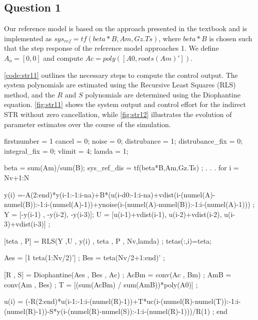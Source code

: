 \FloatBarrier
\subsection{Question 1}
Our reference model is based on the approach presented in the textbook and is implemented as $sys_{ref}=tf(beta*B,Am,Gz.Ts)$, where $beta*B$ is chosen such that the step response of the reference model approaches 1. We define $A_o =  [0 ,0]$ and compute $ Ac = poly([A0 ,roots(Am)'])$.

\autoref{code:str11} outlines the necessary steps to compute the control output. The system polynomials are estimated using the Recursive Least Squares (RLS) method, and the $R$ and $S$ polynomials are determined using the Diophantine equation. \autoref{fig:str11} shows the system output and control effort for the indirect STR without zero cancellation, while \autoref{fig:str12} illustrates the evolution of parameter estimates over the course of the simulation.


\begin{code}
	\begin{matlabcode}{firstnumber = 1}
cancel = 0; %
noise = 0; %
distrubance = 1; %
distrubance_fix = 0; %
integral_fix = 0; %
vlimit = 4; %
lamda = 1;

beta = sum(Am)/sum(B);
sys_ref_dis = tf(beta*B,Am,Gz.Ts) ;
. . .
for i = Nv+1:N
	
	y(i) =-A(2:end)*y(i-1:-1:i-na)+B*(u(i-d0:-1:i-na)+vdist(i-(numel(A)-numel(B)):-1:i-(numel(A)-1))+ynoise(i-(numel(A)-numel(B)):-1:i-(numel(A)-1))) ;
	Y = [-y(i-1) , -y(i-2), -y(i-3)];
	U = [u(i-1)+vdist(i-1), u(i-2)+vdist(i-2), u(i-3)+vdist(i-3)] ;
	
	[teta , P] = RLS(Y ,U , y(i) , teta , P , Nv,lamda) ;
	tetas(:,i)=teta;
	
	Aes = [1 teta(1:Nv/2)'] ;
	Bes = teta(Nv/2+1:end)' ;
	
	[R , S] = Diophantine(Aes , Bes , Ac)  ;
	AcBm = conv(Ac , Bm) ;
	AmB = conv(Am , Bes) ;
	T = [(sum(AcBm) / sum(AmB))*poly(A0)] ;
	
	u(i) = (-R(2:end)*u(i-1:-1:i-(numel(R)-1))+T*uc(i-(numel(R)-numel(T)):-1:i-(numel(R)-1))-S*y(i-(numel(R)-numel(S)):-1:i-(numel(R)-1)))/R(1) ;
end
	\end{matlabcode}
	\label{code:str11}
\end{code}

